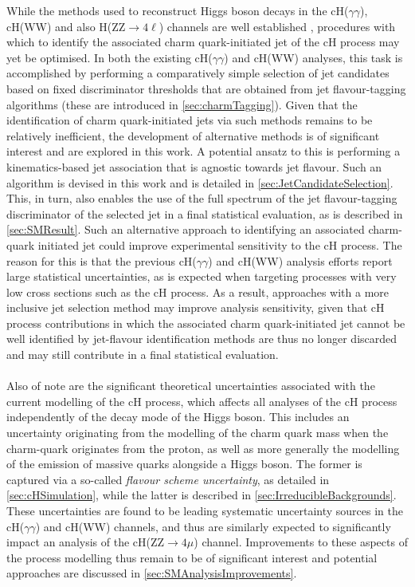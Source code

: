 While the methods used to reconstruct Higgs boson decays in the cH($\gamma\gamma$), cH(WW) and also H(ZZ$\rightarrow4\ell$) channels are well established \cite{HWWPaper}\cite{HgammagammaPaper}\cite{HIG19-001}, procedures with which to identify the associated charm quark-initiated jet of the cH process may yet be optimised. In both the existing cH($\gamma\gamma$) and cH(WW) analyses, this task is accomplished by performing a comparatively simple selection of jet candidates based on fixed discriminator thresholds that are obtained from jet flavour-tagging algorithms (these are introduced in \autoref{sec:charmTagging}). Given that the identification of charm quark-initiated jets via such methods remains to be relatively inefficient, the development of alternative methods is of significant interest and are explored in this work. A potential ansatz to this is performing a kinematics-based jet association that is agnostic towards jet flavour. Such an algorithm is devised in this work and is detailed in \autoref{sec:JetCandidateSelection}. This, in turn, also enables the use of the full spectrum of the jet flavour-tagging discriminator of the selected jet in a final statistical evaluation, as is described in \autoref{sec:SMResult}. Such an alternative approach to identifying an associated charm-quark initiated jet could improve experimental sensitivity to the cH process. The reason for this is that the previous cH($\gamma\gamma$) and cH(WW) analysis efforts report large statistical uncertainties, as is expected when targeting processes with very low cross sections such as the cH process. As a result, approaches with a more inclusive jet selection method may improve analysis sensitivity, given that cH process contributions in which the associated charm quark-initiated jet cannot be well identified by jet-flavour identification methods are thus no longer discarded and may still contribute in a final statistical evaluation. \\
\\
Also of note are the significant theoretical uncertainties associated with the current modelling of the cH process, which affects all analyses of the cH process independently of the decay mode of the Higgs boson. This includes an uncertainty originating from the modelling of the charm quark mass when the charm-quark originates from the proton, as well as more generally the modelling of the emission of massive quarks alongside a Higgs boson. The former is captured via a so-called \textit{flavour scheme uncertainty}, as detailed in \autoref{sec:cHSimulation}, while the latter is described in \autoref{sec:IrreducibleBackgrounds}. These uncertainties are found to be leading systematic uncertainty sources in the cH($\gamma\gamma$) and cH(WW) channels, and thus are similarly expected to significantly impact an analysis of the cH(ZZ$\rightarrow4\mu$) channel. Improvements to these aspects of the process modelling thus remain to be of significant interest and potential approaches are discussed in \autoref{sec:SMAnalysisImprovements}. \\
